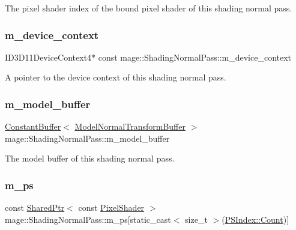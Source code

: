 The pixel shader index of the bound pixel shader of this shading normal pass. \hypertarget{classmage_1_1_shading_normal_pass_a48b0f07fd3f47f40e53e36354879979b}{}\label{classmage_1_1_shading_normal_pass_a48b0f07fd3f47f40e53e36354879979b} 
\subsubsection{\texorpdfstring{m\+\_\+device\+\_\+context}{m\_device\_context}}
{\footnotesize\ttfamily I\+D3\+D11\+Device\+Context4$\ast$ const mage\+::\+Shading\+Normal\+Pass\+::m\+\_\+device\+\_\+context\hspace{0.3cm}{\ttfamily [private]}}

A pointer to the device context of this shading normal pass. \hypertarget{classmage_1_1_shading_normal_pass_a948daea5dea9b2cd2b2eaf30a1341231}{}\label{classmage_1_1_shading_normal_pass_a948daea5dea9b2cd2b2eaf30a1341231} 
\subsubsection{\texorpdfstring{m\+\_\+model\+\_\+buffer}{m\_model\_buffer}}
{\footnotesize\ttfamily \hyperlink{classmage_1_1_constant_buffer}{Constant\+Buffer}$<$ \hyperlink{structmage_1_1_model_normal_transform_buffer}{Model\+Normal\+Transform\+Buffer} $>$ mage\+::\+Shading\+Normal\+Pass\+::m\+\_\+model\+\_\+buffer\hspace{0.3cm}{\ttfamily [private]}}

The model buffer of this shading normal pass. \hypertarget{classmage_1_1_shading_normal_pass_a3dbbd1bd2612ccaec66c551f251a47e9}{}\label{classmage_1_1_shading_normal_pass_a3dbbd1bd2612ccaec66c551f251a47e9} 
\subsubsection{\texorpdfstring{m\+\_\+ps}{m\_ps}}
{\footnotesize\ttfamily const \hyperlink{namespacemage_a1e01ae66713838a7a67d30e44c67703e}{Shared\+Ptr}$<$ const \hyperlink{namespacemage_a27ecaf266420ee7a494d64edc0757129}{Pixel\+Shader} $>$ mage\+::\+Shading\+Normal\+Pass\+::m\+\_\+ps\mbox{[}static\+\_\+cast$<$ size\+\_\+t $>$(\hyperlink{classmage_1_1_shading_normal_pass_a05bd054001817e1f57cd5cd41e2e522eae93f994f01c537c4e2f7d8528c3eb5e9}{P\+S\+Index\+::\+Count})\mbox{]}\hspace{0.3cm}{\ttfamily [private]}}


